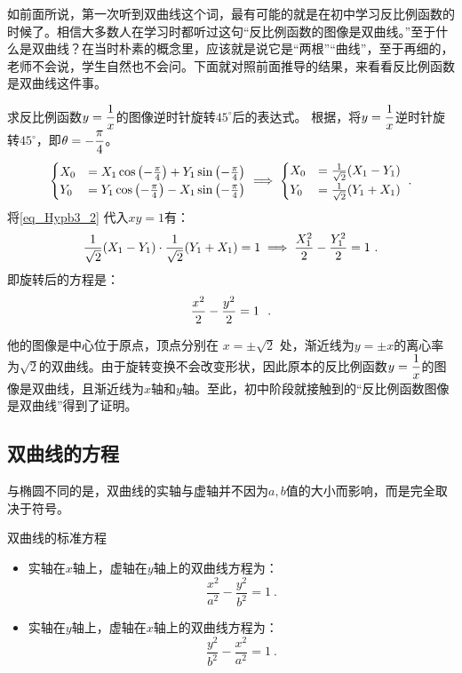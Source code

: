 如前面所说，第一次听到双曲线这个词，最有可能的就是在初中学习反比例函数的时候了。相信大多数人在学习时都听过这句“反比例函数的图像是双曲线。”至于什么是双曲线？在当时朴素的概念里，应该就是说它是“两根”“曲线”，至于再细的，老师不会说，学生自然也不会问。下面就对照前面推导的结果，来看看反比例函数是双曲线这件事。

\begin{example}{求反比例函数$\displaystyle y={1\over x}$的图像逆时针旋转$45^\circ$后的表达式。}
根据，将$\displaystyle y={1\over x}$逆时针旋转$45^\circ$，即$\displaystyle\theta=-{\pi\over4}$。
\begin{equation}\label{eq_Hypb3_2}
\begin{cases}
\displaystyle
X_0&=X_1 \cos \left(-{\pi\over4}\right) + Y_1 \sin \left(-{\pi\over4}\right)\\
Y_0&=Y_1 \cos \left(-{\pi\over4}\right) - X_1 \sin \left(-{\pi\over4}\right)\\
\end{cases}\implies
\begin{cases}
X_0&={1\over\sqrt{2}}(X_1 - Y_1)\\
Y_0&={1\over\sqrt{2}}(Y_1+ X_1) \\
\end{cases}~.
\end{equation}
将\autoref{eq_Hypb3_2} 代入$xy=1$有：
\begin{equation}
\displaystyle
{1\over\sqrt{2}}(X_1 - Y_1)\cdot{1\over\sqrt{2}}(Y_1+ X_1)=1\implies {X_1^2\over2}- {Y_1^2\over2}=1~.
\end{equation}
即旋转后的方程是：
\begin{equation}
{x^2\over2}- {y^2\over2}=1~~.
\end{equation}
\end{example}

他的图像是中心位于原点，顶点分别在 $x = \pm \sqrt{2}$ 处，渐近线为$y = \pm x$的离心率为$\sqrt{2}$的双曲线。由于旋转变换不会改变形状，因此原本的反比例函数$\displaystyle y={1\over x}$的图像是双曲线，且渐近线为$x$轴和$y$轴。至此，初中阶段就接触到的“反比例函数图像是双曲线”得到了证明。

\subsection{双曲线的方程}

与椭圆不同的是，双曲线的实轴与虚轴并不因为$a,b$值的大小而影响，而是完全取决于符号。
\begin{theorem}{双曲线的标准方程}
\begin{itemize}
\item 实轴在$x$轴上，虚轴在$y$轴上的双曲线方程为：
\begin{equation}\label{eq_Hypb3_4}
\frac{x^2}{a^2} - \frac{y^2}{b^2} = 1~.
\end{equation}
\item 实轴在$y$轴上，虚轴在$x$轴上的双曲线方程为：
\begin{equation}
\frac{y^2}{b^2} -\frac{x^2}{a^2}  = 1~.
\end{equation}
\end{itemize}
\end{theorem}

